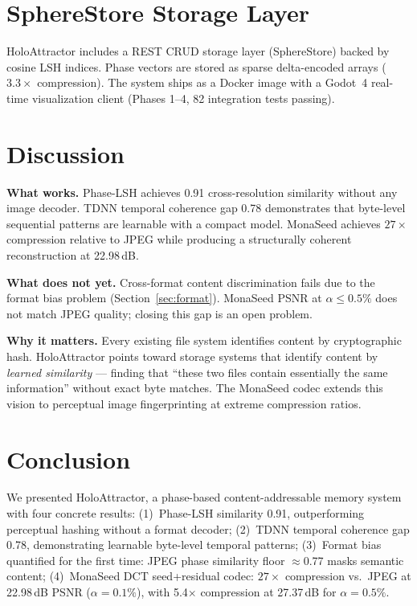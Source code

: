 \documentclass[10pt,twocolumn]{article}
\begin{document}
\section{SphereStore Storage Layer}
HoloAttractor includes a REST CRUD storage layer (SphereStore) backed by
cosine LSH indices. Phase vectors are stored as sparse delta-encoded arrays
($3.3\times$ compression). The system ships as a Docker image with a Godot~4
real-time visualization client (Phases 1--4, 82 integration tests passing).

\section{Discussion}
\textbf{What works.} Phase-LSH achieves 0.91 cross-resolution similarity
without any image decoder. TDNN temporal coherence gap 0.78 demonstrates
that byte-level sequential patterns are learnable with a compact model.
MonaSeed achieves $27\times$ compression relative to JPEG while producing a
structurally coherent reconstruction at 22.98\,dB.

\textbf{What does not yet.} Cross-format content discrimination fails due to
the format bias problem (Section~\ref{sec:format}). MonaSeed PSNR at
$\alpha\leq0.5\%$ does not match JPEG quality; closing this gap is an open
problem.

\textbf{Why it matters.} Every existing file system identifies content by
cryptographic hash. HoloAttractor points toward storage systems that identify
content by \emph{learned similarity} --- finding that ``these two files
contain essentially the same information'' without exact byte matches. The
MonaSeed codec extends this vision to perceptual image fingerprinting at
extreme compression ratios.

\section{Conclusion}
We presented HoloAttractor, a phase-based content-addressable memory system
with four concrete results:
(1)~Phase-LSH similarity 0.91, outperforming perceptual hashing without a
format decoder;
(2)~TDNN temporal coherence gap 0.78, demonstrating learnable byte-level
temporal patterns;
(3)~Format bias quantified for the first time: JPEG phase similarity floor
$\approx$0.77 masks semantic content;
(4)~MonaSeed DCT seed+residual codec: $27\times$ compression vs.\ JPEG at
22.98\,dB PSNR ($\alpha=0.1\%$), with 5.4$\times$ compression at 27.37\,dB
for $\alpha=0.5\%$.
\end{document}
